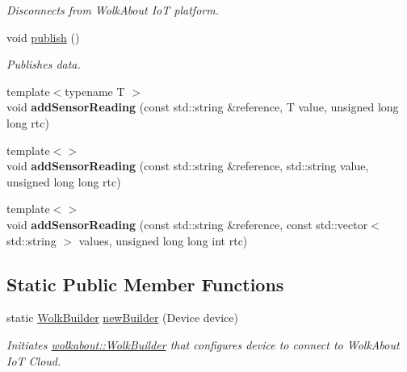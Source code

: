 \begin{DoxyCompactItemize}
\begin{DoxyCompactList}\small\item\em Disconnects from Wolk\+About IoT platform. \end{DoxyCompactList}\item 
void \hyperlink{classwolkabout_1_1Wolk_a692525b11e983643eb12b2bdfc54d4cd}{publish} ()\hypertarget{classwolkabout_1_1Wolk_a692525b11e983643eb12b2bdfc54d4cd}{}\label{classwolkabout_1_1Wolk_a692525b11e983643eb12b2bdfc54d4cd}

\begin{DoxyCompactList}\small\item\em Publishes data. \end{DoxyCompactList}\item 
{\footnotesize template$<$typename T $>$ }\\void {\bfseries add\+Sensor\+Reading} (const std\+::string \&reference, T value, unsigned long long rtc)\hypertarget{classwolkabout_1_1Wolk_a882dcff4a9d9d51fd9d0e76edfd03d9e}{}\label{classwolkabout_1_1Wolk_a882dcff4a9d9d51fd9d0e76edfd03d9e}

\item 
{\footnotesize template$<$$>$ }\\void {\bfseries add\+Sensor\+Reading} (const std\+::string \&reference, std\+::string value, unsigned long long rtc)\hypertarget{classwolkabout_1_1Wolk_a4704e782ac13a380a6d7ccdbabb3847e}{}\label{classwolkabout_1_1Wolk_a4704e782ac13a380a6d7ccdbabb3847e}

\item 
{\footnotesize template$<$$>$ }\\void {\bfseries add\+Sensor\+Reading} (const std\+::string \&reference, const std\+::vector$<$ std\+::string $>$ values, unsigned long long int rtc)\hypertarget{classwolkabout_1_1Wolk_ac55d5659566c66a513cdbb2e29833028}{}\label{classwolkabout_1_1Wolk_ac55d5659566c66a513cdbb2e29833028}

\end{DoxyCompactItemize}
\subsection*{Static Public Member Functions}
\begin{DoxyCompactItemize}
\item 
static \hyperlink{classwolkabout_1_1WolkBuilder}{Wolk\+Builder} \hyperlink{classwolkabout_1_1Wolk_a91270bb8552c2dee634e552111db4bb0}{new\+Builder} (Device device)
\begin{DoxyCompactList}\small\item\em Initiates \hyperlink{classwolkabout_1_1WolkBuilder}{wolkabout\+::\+Wolk\+Builder} that configures device to connect to Wolk\+About IoT Cloud. \end{DoxyCompactList}\end{DoxyCompactItemize}

